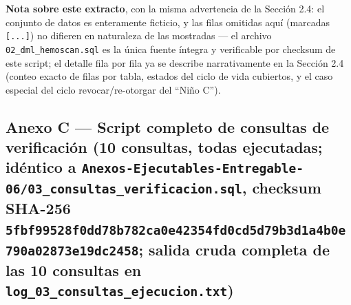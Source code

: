 \documentclass[11pt,a4paper]{article}
\begin{document}
\textbf{Nota sobre este extracto}, con la misma advertencia de la Sección 2.4: el conjunto de datos es enteramente ficticio, y las filas omitidas aquí (marcadas \texttt{{[}...{]}}) no difieren en naturaleza de las mostradas --- el archivo \texttt{02\_dml\_hemoscan.sql} es la única fuente íntegra y verificable por checksum de este script; el detalle fila por fila ya se describe narrativamente en la Sección 2.4 (conteo exacto de filas por tabla, estados del ciclo de vida cubiertos, y el caso especial del ciclo revocar/re-otorgar del ``Niño C'').

\subsection{\texorpdfstring{Anexo C --- Script completo de consultas de verificación (10 consultas, todas ejecutadas; idéntico a \texttt{Anexos-Ejecutables-Entregable-06/03\_consultas\_verificacion.sql}, checksum SHA-256 \texttt{5fbf99528f0dd78b782ca0e42354fd0cd5d79b3d1a4b0e790a02873e19dc2458}; salida cruda completa de las 10 consultas en \texttt{log\_03\_consultas\_ejecucion.txt})}{Anexo C --- Script completo de consultas de verificación (10 consultas, todas ejecutadas; idéntico a Anexos-Ejecutables-Entregable-06/03\_consultas\_verificacion.sql, checksum SHA-256 5fbf99528f0dd78b782ca0e42354fd0cd5d79b3d1a4b0e790a02873e19dc2458; salida cruda completa de las 10 consultas en log\_03\_consultas\_ejecucion.txt)}}\label{anexo-c-script-completo-de-consultas-de-verificaciuxf3n-10-consultas-todas-ejecutadas-iduxe9ntico-a-anexos-ejecutables-entregable-0603_consultas_verificacion.sql-checksum-sha-256-5fbf99528f0dd78b782ca0e42354fd0cd5d79b3d1a4b0e790a02873e19dc2458-salida-cruda-completa-de-las-10-consultas-en-log_03_consultas_ejecucion.txt}
\end{document}
